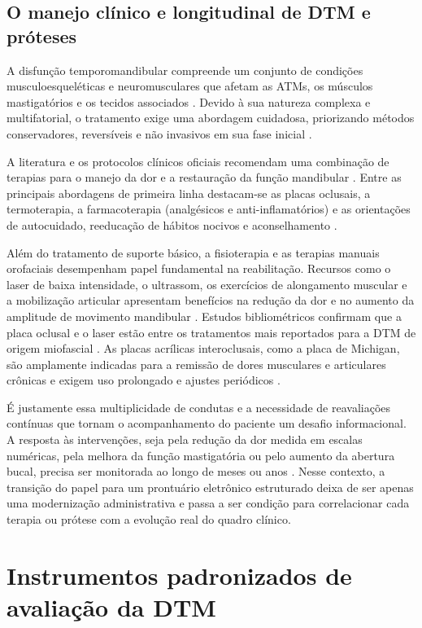 \subsection{O manejo clínico e longitudinal de DTM e próteses}

A disfunção temporomandibular compreende um conjunto de condições musculoesqueléticas e neuromusculares que afetam as ATMs, os músculos mastigatórios e os tecidos associados \cite{pbh2016}. Devido à sua natureza complexa e multifatorial, o tratamento exige uma abordagem cuidadosa, priorizando métodos conservadores, reversíveis e não invasivos em sua fase inicial \cite{pbh2016}.

A literatura e os protocolos clínicos oficiais recomendam uma combinação de terapias para o manejo da dor e a restauração da função mandibular \cite{sassi2018}. Entre as principais abordagens de primeira linha destacam-se as placas oclusais, a termoterapia, a farmacoterapia (analgésicos e anti-inflamatórios) e as orientações de autocuidado, reeducação de hábitos nocivos e aconselhamento \cite{batista2024,sms-sp2023}.

Além do tratamento de suporte básico, a fisioterapia e as terapias manuais orofaciais desempenham papel fundamental na reabilitação. Recursos como o laser de baixa intensidade, o ultrassom, os exercícios de alongamento muscular e a mobilização articular apresentam benefícios na redução da dor e no aumento da amplitude de movimento mandibular \cite{pelicioli2017}. Estudos bibliométricos confirmam que a placa oclusal e o laser estão entre os tratamentos mais reportados para a DTM de origem miofascial \cite{batista2024}. As placas acrílicas interoclusais, como a placa de Michigan, são amplamente indicadas para a remissão de dores musculares e articulares crônicas e exigem uso prolongado e ajustes periódicos \cite{sms-sp2023}.

É justamente essa multiplicidade de condutas e a necessidade de reavaliações contínuas que tornam o acompanhamento do paciente um desafio informacional. A resposta às intervenções, seja pela redução da dor medida em escalas numéricas, pela melhora da função mastigatória ou pelo aumento da abertura bucal, precisa ser monitorada ao longo de meses ou anos \cite{sassi2018,pbh2016}. Nesse contexto, a transição do papel para um prontuário eletrônico estruturado deixa de ser apenas uma modernização administrativa e passa a ser condição para correlacionar cada terapia ou prótese com a evolução real do quadro clínico.

\section{Instrumentos padronizados de avaliação da DTM}
\label{sec:rdc}

